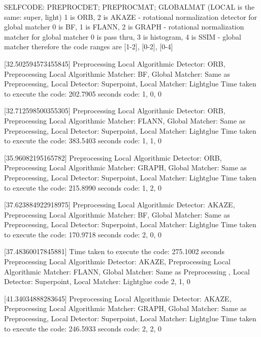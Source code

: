 SELFCODE: PREPROCDET; PREPROCMAT; GLOBALMAT (LOCAL is the same: super, light)
1 is ORB, 2 is AKAZE - rotational normalization detector for global matcher
0 is BF, 1 is FLANN, 2 is GRAPH - rotational normalization matcher for global matcher
0 is pass thru, 3 is histogram, 4 is SSIM - global matcher
therefore the code ranges are [1-2], [0-2], [0-4]



[32.502594573455845]
Preprocessing Local Algorithmic Detector: ORB, Preprocessing Local Algorithmic Matcher: BF, Global Matcher: Same as Preprocessing, Local Detector: Superpoint, Local Matcher: Lightglue
Time taken to execute the code: 202.7905 seconds
code: 1, 0, 0

[32.712598500355305]
Preprocessing Local Algorithmic Detector: ORB, Preprocessing Local Algorithmic Matcher: FLANN, Global Matcher: Same as Preprocessing, Local Detector: Superpoint, Local Matcher: Lightglue
Time taken to execute the code: 383.5403 seconds
code: 1, 1, 0


[35.96082195165782]
Preprocessing Local Algorithmic Detector: ORB, Preprocessing Local Algorithmic Matcher: GRAPH, Global Matcher: Same as Preprocessing, Local Detector: Superpoint, Local Matcher: Lightglue
Time taken to execute the code: 215.8990 seconds
code: 1, 2, 0


[37.623884922918975]
Preprocessing Local Algorithmic Detector: AKAZE, Preprocessing Local Algorithmic Matcher: BF, Global Matcher: Same as Preprocessing, Local Detector: Superpoint, Local Matcher: Lightglue
Time taken to execute the code: 170.9718 seconds
code: 2, 0, 0


[37.48360017845881]
Time taken to execute the code: 275.1002 seconds
Preprocessing Local Algorithmic Detector: AKAZE, Preprocessing Local Algorithmic Matcher: FLANN, Global Matcher: Same as Preprocessing , Local Detector: Superpoint, Local Matcher: Lightglue
code 2, 1, 0

[41.34034888283645]
Preprocessing Local Algorithmic Detector: AKAZE, Preprocessing Local Algorithmic Matcher: GRAPH, Global Matcher: Same as Preprocessing, Local Detector: Superpoint, Local Matcher: Lightglue
Time taken to execute the code: 246.5933 seconds
code: 2, 2, 0

